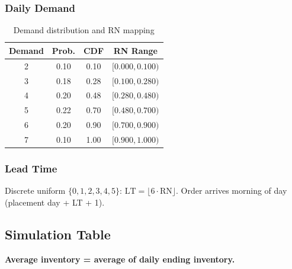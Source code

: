 \documentclass[12pt,a4paper]{article}
\begin{document}
\subsubsection*{Daily Demand}
\begin{table}[H]
\centering
\caption{Demand distribution and RN mapping}
\begin{tabular}{@{}cccc@{}}
\toprule
Demand & Prob. & CDF & RN Range \\
\midrule
2 & 0.10 & 0.10 & $[0.000,0.100)$ \\
3 & 0.18 & 0.28 & $[0.100,0.280)$ \\
4 & 0.20 & 0.48 & $[0.280,0.480)$ \\
5 & 0.22 & 0.70 & $[0.480,0.700)$ \\
6 & 0.20 & 0.90 & $[0.700,0.900)$ \\
7 & 0.10 & 1.00 & $[0.900,1.000)$ \\
\bottomrule
\end{tabular}
\end{table}

\subsubsection*{Lead Time}
Discrete uniform $\{0,1,2,3,4,5\}$: $\text{LT} = \lfloor 6 \cdot \text{RN} \rfloor$.  
Order arrives morning of day (placement day + LT + 1).

\subsection{Simulation Table}
\textbf{Average inventory = average of daily ending inventory.}
\end{document}
